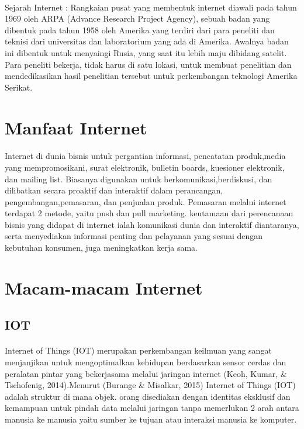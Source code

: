 \documentclass[12pt, a4paper]{article}
\begin{document}
\paragraph{} Sejarah Internet : Rangkaian pusat yang membentuk internet diawali pada tahun 1969 oleh ARPA (Advance Research Project Agency), sebuah badan yang dibentuk pada tahun 1958 oleh Amerika yang terdiri dari para peneliti dan teknisi dari universitas dan laboratorium yang ada di Amerika. Awalnya badan ini dibentuk untuk menyaingi Rusia, yang saat itu lebih maju dibidang satelit. Para peneliti bekerja, tidak harus di satu lokasi, untuk membuat penelitian dan mendedikasikan hasil penelitian tersebut untuk perkembangan teknologi Amerika Serikat.

\section{Manfaat Internet}
\paragraph{} Internet di dunia bisnis untuk pergantian informasi, pencatatan produk,media yang mempromosikani, surat elektronik, bulletin boards, kuesioner elektronik, dan mailing list. Biasanya digunakan untuk berkomunikasi,berdiskusi, dan dilibatkan secara proaktif dan interaktif dalam perancangan, pengembangan,pemasaran, dan penjualan produk. Pemasaran melalui internet terdapat 2 metode, yaitu push dan pull marketing. keutamaan dari perencanaan bisnis yang didapat di internet ialah komunikasi dunia dan interaktif diantaranya, serta menyediakan informasi penting dan pelayanan yang sesuai dengan kebutuhan konsumen, juga meningkatkan kerja sama.

\section{Macam-macam Internet}
\subsection{IOT}
\paragraph{} Internet of Things (IOT) merupakan perkembangan keilmuan yang sangat menjanjikan untuk mengoptimalkan kehidupan berdasarkan sensor cerdas dan peralatan pintar yang bekerjasama melalui jaringan internet (Keoh, Kumar, & Tschofenig, 2014).Menurut (Burange & Misalkar, 2015) Internet of Things (IOT) adalah struktur di mana objek. orang disediakan dengan identitas eksklusif dan kemampuan untuk pindah data melalui jaringan tanpa memerlukan 2 arah antara manusia ke manusia yaitu sumber ke tujuan atau interaksi manusia ke komputer.
\end{document}
